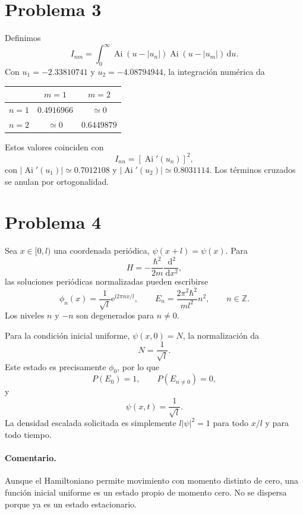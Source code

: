 \documentclass[11pt,a4paper]{article}
\numberwithin{equation}{section}
\renewcommand{\boxed}[1]{#1}
\newcommand{\dd}{\,\mathrm d}
\newcommand{\ii}{\mathrm i}
\newcommand{\e}{\mathrm e}
\newcommand{\hb}{\hbar}
\begin{document}
\section{Problema 3}
Definimos
\begin{equation}
I_{nm}=\int_0^\infty \operatorname{Ai}(u-|u_n|)\operatorname{Ai}(u-|u_m|)\dd u.
\end{equation}
Con $u_1=-2.33810741$ y $u_2=-4.08794944$, la integración numérica da
\begin{center}
\begin{tabular}{c|cc}\toprule
&$m=1$&$m=2$\\\midrule
$n=1$&$0.4916966$&$\simeq0$\\
$n=2$&$\simeq0$&$0.6449879$\\\bottomrule
\end{tabular}
\end{center}
Estos valores coinciden con
\begin{equation}
I_{nn}=[\operatorname{Ai}'(u_n)]^2,
\end{equation}
con $|\operatorname{Ai}'(u_1)|\simeq0.7012108$ y $|\operatorname{Ai}'(u_2)|\simeq0.8031114$. Los términos cruzados se anulan por ortogonalidad.

\section{Problema 4}
Sea $x\in[0,l)$ una coordenada periódica, $\psi(x+l)=\psi(x)$. Para
\begin{equation}
H=-\frac{\hb^2}{2m}\frac{\dd^2}{\dd x^2},
\end{equation}
las soluciones periódicas normalizadas pueden escribirse
\begin{equation}
\boxed{\phi_n(x)=\frac1{\sqrt l}\e^{\ii2\pi nx/l},\qquad
E_n=\frac{2\pi^2\hb^2}{ml^2}n^2,\qquad n\in\mathbb Z.}
\end{equation}
Los niveles $n$ y $-n$ son degenerados para $n\neq0$.

Para la condición inicial uniforme, $\psi(x,0)=N$, la normalización da
\begin{equation}
\boxed{N=\frac1{\sqrt l}.}
\end{equation}
Este estado es precisamente $\phi_0$, por lo que
\begin{equation}
P(E_0)=1,\qquad P(E_{n\neq0})=0,
\end{equation}
y
\begin{equation}
\boxed{\psi(x,t)=\frac1{\sqrt l}.}
\end{equation}
La densidad escalada solicitada es simplemente $l|\psi|^2=1$ para todo $x/l$ y para todo tiempo.

\paragraph{Comentario.}
Aunque el Hamiltoniano permite movimiento con momento distinto de cero, una función inicial uniforme es un estado propio de momento cero. No se dispersa porque ya es un estado estacionario.
\end{document}
